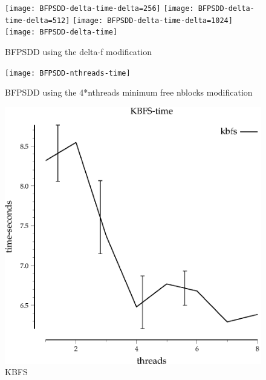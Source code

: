\documentclass{article}
\begin{document}
\begin{figure}
\begin{center}
\texttt{[image: BFPSDD-delta-time-delta=256]}
\texttt{[image: BFPSDD-delta-time-delta=512]}
\texttt{[image: BFPSDD-delta-time-delta=1024]}
\texttt{[image: BFPSDD-delta-time]}
\end{center}
\caption{BFPSDD using the delta-f modification}
\end{figure}

\begin{figure}
\begin{center}
\texttt{[image: BFPSDD-nthreads-time]}
\end{center}
\caption{BFPSDD using the 4*nthreads minimum free nblocks modification}
\end{figure}


\begin{figure}
\begin{center}
\includegraphics{KBFS-time}
\end{center}
\caption{KBFS}
\end{figure}
\end{document}
